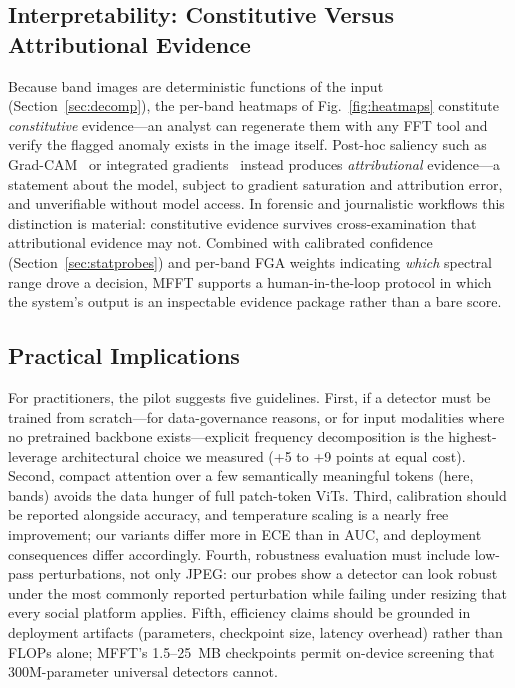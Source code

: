 \documentclass[journal]{IEEEtran}
\begin{document}
\subsection{Interpretability: Constitutive Versus Attributional Evidence}
\label{sec:interpretability}
Because band images are deterministic functions of the input (Section~\ref{sec:decomp}), the per-band heatmaps of Fig.~\ref{fig:heatmaps} constitute \emph{constitutive} evidence---an analyst can regenerate them with any FFT tool and verify the flagged anomaly exists in the image itself. Post-hoc saliency such as Grad-CAM~\cite{selvaraju2017} or integrated gradients~\cite{sundararajan2017} instead produces \emph{attributional} evidence---a statement about the model, subject to gradient saturation and attribution error, and unverifiable without model access. In forensic and journalistic workflows this distinction is material: constitutive evidence survives cross-examination that attributional evidence may not. Combined with calibrated confidence (Section~\ref{sec:statprobes}) and per-band FGA weights indicating \emph{which} spectral range drove a decision, MFFT supports a human-in-the-loop protocol in which the system's output is an inspectable evidence package rather than a bare score.

\subsection{Practical Implications}
For practitioners, the pilot suggests five guidelines. First, if a detector must be trained from scratch---for data-governance reasons, or for input modalities where no pretrained backbone exists---explicit frequency decomposition is the highest-leverage architectural choice we measured (+5 to +9 points at equal cost). Second, compact attention over a few semantically meaningful tokens (here, bands) avoids the data hunger of full patch-token ViTs. Third, calibration should be reported alongside accuracy, and temperature scaling is a nearly free improvement; our variants differ more in ECE than in AUC, and deployment consequences differ accordingly. Fourth, robustness evaluation must include low-pass perturbations, not only JPEG: our probes show a detector can look robust under the most commonly reported perturbation while failing under resizing that every social platform applies. Fifth, efficiency claims should be grounded in deployment artifacts (parameters, checkpoint size, latency overhead) rather than FLOPs alone; MFFT's 1.5--25~MB checkpoints permit on-device screening that 300M-parameter universal detectors cannot.
\end{document}
